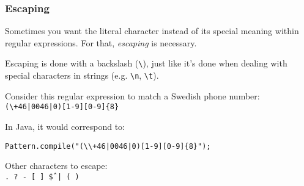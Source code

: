 \documentclass{beamer}
\begin{document}
	\begin{frame}[fragile]
		\frametitle{Escaping}

		Sometimes you want the literal character instead of its special meaning within regular expressions. For that, \emph{escaping} is necessary.

		Escaping is done with a backslash (\texttt{\textbackslash}), just like it's done when dealing with special characters in strings (e.g. \texttt{\textbackslash n}, \texttt{\textbackslash t}).

		\pause
		Consider this regular expression to match a Swedish phone number: \\
		\texttt{(\textbackslash+46|0046|0)[1-9][0-9]\{8\}}

		\pause
		In Java, it would correspond to:
\begin{lstlisting}[style=customjava]
Pattern.compile("(\\+46|0046|0)[1-9][0-9]{8}");\end{lstlisting}

		\pause
		Other characters to escape: \\
		\texttt{. ? - [ ] \^ \$ | ( )}
	\end{frame}
\end{document}

